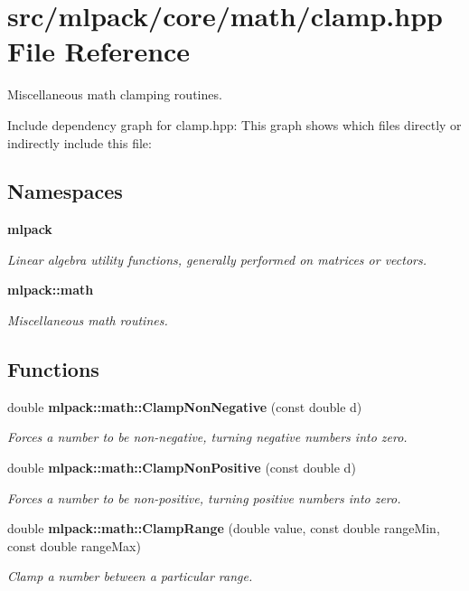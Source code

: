\section{src/mlpack/core/math/clamp.hpp File Reference}
\label{clamp_8hpp}


Miscellaneous math clamping routines.  


Include dependency graph for clamp.\-hpp\-:
This graph shows which files directly or indirectly include this file\-:
\subsection*{Namespaces}
\begin{DoxyCompactItemize}
\item 
{\bf mlpack}
\begin{DoxyCompactList}\small\item\em Linear algebra utility functions, generally performed on matrices or vectors. \end{DoxyCompactList}\item 
{\bf mlpack\-::math}
\begin{DoxyCompactList}\small\item\em Miscellaneous math routines. \end{DoxyCompactList}\end{DoxyCompactItemize}
\subsection*{Functions}
\begin{DoxyCompactItemize}
\item 
double {\bf mlpack\-::math\-::\-Clamp\-Non\-Negative} (const double d)
\begin{DoxyCompactList}\small\item\em Forces a number to be non-\/negative, turning negative numbers into zero. \end{DoxyCompactList}\item 
double {\bf mlpack\-::math\-::\-Clamp\-Non\-Positive} (const double d)
\begin{DoxyCompactList}\small\item\em Forces a number to be non-\/positive, turning positive numbers into zero. \end{DoxyCompactList}\item 
double {\bf mlpack\-::math\-::\-Clamp\-Range} (double value, const double range\-Min, const double range\-Max)
\begin{DoxyCompactList}\small\item\em Clamp a number between a particular range. \end{DoxyCompactList}\end{DoxyCompactItemize}


